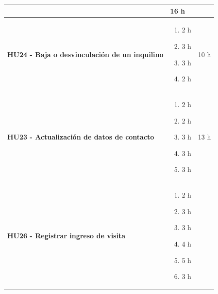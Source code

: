 \begin{longtable}{|p{10.5cm}|p{2.5cm}|c|}
        &
            16 h
    
    \\ \hline
        
            \textbf{HU24 - Baja o desvinculación de un inquilino} 
        
        &

            \begin{enumerate}[leftmargin=*,nosep]
                \item 2 h
                \item 3 h
                \item 3 h
                \item 2 h
            \end{enumerate} 
        
        &
            10 h
    
    \\ \hline
        
            \textbf{HU23 - Actualización de datos de contacto} 
        
        &

            \begin{enumerate}[leftmargin=*,nosep]
                \item 2 h
                \item 2 h
                \item 3 h
                \item 3 h
                \item 3 h
            \end{enumerate} 
        
        &
            13 h
    
    \\ \hline
        
            \textbf{HU26 - Registrar ingreso de visita} 
        
        &

            \begin{enumerate}[leftmargin=*,nosep]
                \item 2 h
                \item 3 h
                \item 3 h
                \item 4 h
                \item 5 h
                \item 3 h
            \end{enumerate} 
        

\end{longtable}
